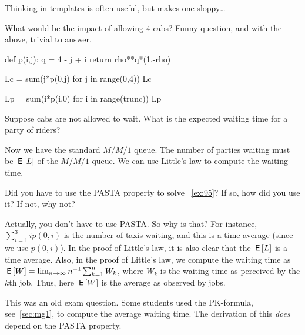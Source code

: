 \begin{exercise}[Hall 5.22]
\begin{solution}
Thinking in templates is often useful, but makes one sloppy\ldots

What would be the impact of allowing 4 cabs? Funny question, and with the above, trivial to answer.

\begin{pyconsole}
def p(i,j):
 q = 4 - j + i
 return rho**q*(1.-rho)
 
\end{pyconsole}

\begin{pyconsole}
Lc = sum(j*p(0,j) for j in range(0,4))
Lc

Lp = sum(i*p(i,0) for i in range(trunc))
Lp
 
\end{pyconsole}
\end{solution}
\end{exercise}


\begin{extra}
Suppose cabs are not allowed to wait. What is the expected waiting time for a party of riders?

\begin{solution}
Now we have the standard $M/M/1$ queue. The number of parties waiting must be $\,\mathsf{E}\left[L\right]$ of the $M/M/1$ queue. We can use Little's law to compute the waiting time.
\end{solution}
\end{extra}



\begin{exercise}
 Did you have to use the PASTA property to solve ~\cref{ex:95}? If so, how did you use it? If not, why not?
\begin{solution}
 Actually, you don't have to use PASTA.
 So why is that?
 For instance, $\sum_{i=1}^3 i p(0, i)$ is the number of taxis waiting, and this is a time average (since we use $p(0, i)$).
 In the proof of Little's law, it is also clear that the $\,\mathsf{E}\left[L\right]$ is a time average.
 Also, in the proof of Little's law, we compute the waiting time as $\,\mathsf{E}\left[W\right] = \lim_{n\to\infty} n^{-1}\sum_{k=1}^n W_k$, where $W_k$ is the waiting time as perceived by the $k$th job.
 Thus, here $\,\mathsf{E}\left[W\right]$ is the average as observed by jobs.

 This was an old exam question.
 Some students used the PK-formula, see~\cref{sec:mg1}, to compute the average waiting time.
 The derivation of this \emph{does} depend on the PASTA property.
\end{solution}
\end{exercise}



